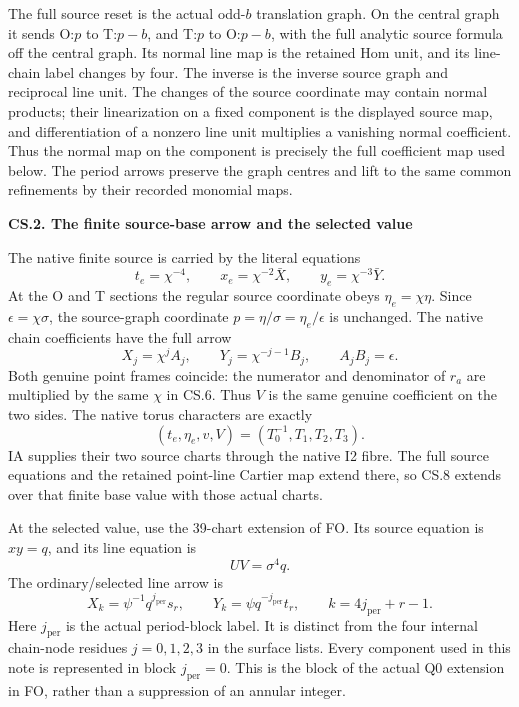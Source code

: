 The full source reset is the actual odd-\(b\) translation graph.
On the central graph it sends O:\(p\) to T:\(p-b\), and T:\(p\)
to O:\(p-b\), with the full analytic source formula off the
central graph. Its normal line map is the retained Hom unit,
and its line-chain label changes by four. The inverse is the
inverse source graph and reciprocal line unit. The changes of
the source coordinate may contain normal products; their
linearization on a fixed component is the displayed source
map, and differentiation of a nonzero line unit multiplies a
vanishing normal coefficient. Thus the normal map on the
component is precisely the full coefficient map used below.
The period arrows preserve the graph centres and lift to the
same common refinements by their recorded monomial maps.

\par

\medskip\noindent\textbf{CS.2. The finite source-base arrow and the selected value}

\par\nobreak

The native finite source is carried by the literal equations
\[
 t_e=\chi^{-4},\qquad
 x_e=\chi^{-2}\bar X,\qquad
 y_e=\chi^{-3}\bar Y.
 \tag{CS.6}
\]
At the O and T sections the regular source coordinate obeys
\(\eta_e=\chi\eta\). Since \(\epsilon=\chi\sigma\), the
source-graph coordinate \(p=\eta/\sigma=\eta_e/\epsilon\)
is unchanged. The native chain coefficients have the full
arrow
\[
 X_j=\chi^jA_j,\qquad
 Y_j=\chi^{-j-1}B_j,\qquad
 A_jB_j=\epsilon.
 \tag{CS.7}
\]
Both genuine point frames coincide: the numerator and
denominator of \(r_a\) are multiplied by the same \(\chi\)
in CS.6. Thus \(V\) is the same genuine coefficient on the
two sides. The native torus characters are exactly
\[
 (t_e,\eta_e,v,V)=(T_0^{-1},T_1,T_2,T_3).
 \tag{CS.8}
\]
IA supplies their two source charts through the native I2
fibre. The full source equations and the retained point-line
Cartier map extend there, so CS.8 extends over that finite
base value with those actual charts.

At the selected value, use the 39-chart extension of FO.
Its source equation is \(xy=q\), and its line equation is
\[
 UV=\sigma^4q.
 \tag{CS.9}
\]
The ordinary/selected line arrow is
\[
 X_k=\psi^{-1}q^{j_{\mathrm{per}}}s_r,\qquad
 Y_k=\psi q^{-j_{\mathrm{per}}}t_r,\qquad
 k=4j_{\mathrm{per}}+r-1.
 \tag{CS.10}
\]
Here \(j_{\mathrm{per}}\) is the actual period-block label.
It is distinct from the four internal chain-node residues
\(j=0,1,2,3\) in the surface lists. Every component used in
this note is represented in block \(j_{\mathrm{per}}=0\).
This is the block of the actual Q0 extension in FO, rather
than a suppression of an annular integer.

